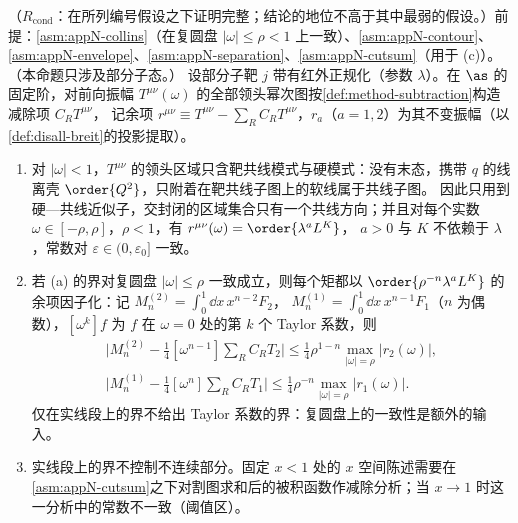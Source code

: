 \begin{proposition}\label{prop:disall-two-routes}
（$R_{\mathrm{cond}}$：在所列编号假设之下证明完整；结论的地位不高于其中最弱的假设。）前提：\cref{asm:appN-collins}（在复圆盘 $|\omega|\le\rho<1$ 上一致）、\cref{asm:appN-contour}、\cref{asm:appN-envelope}、\cref{asm:appN-separation}、\cref{asm:appN-cutsum}（用于 (c)）。（本命题只涉及部分子态。）
设部分子靶 $j$ 带有红外正规化（参数 $\lambda$）。在 $\as$ 的固定阶，对前向振幅 $T^{\mu\nu}(\omega)$ 的全部领头幂次图按\cref{def:method-subtraction}构造减除项 $C_RT^{\mu\nu}$，
记余项 $r^{\mu\nu}\equiv T^{\mu\nu}-\sum_RC_RT^{\mu\nu}$，$r_a$（$a=1,2$）为其不变振幅（以\cref{def:disall-breit}的投影提取）。
\begin{enumerate}[label=(\alph*),leftmargin=2em,itemsep=1pt,topsep=2pt]
\item 对 $|\omega|<1$，$T^{\mu\nu}$ 的领头区域只含靶共线模式与硬模式：没有末态，携带 $q$ 的线离壳 $\order{Q^2}$，只附着在靶共线子图上的软线属于共线子图。
因此只用到硬—共线近似子，交封闭的区域集合只有一个共线方向；并且对每个实数 $\omega\in[-\rho,\rho]$，$\rho<1$，有 $r^{\mu\nu}(\omega)=\order{\lambda^aL^K}$，
$a>0$ 与 $K$ 不依赖于 $\lambda$，常数对 $\varepsilon\in(0,\varepsilon_0]$ 一致。
\item 若 (a) 的界对复圆盘 $|\omega|\le\rho$ 一致成立，则每个矩都以 $\order{\rho^{-n}\lambda^aL^K}$ 的余项因子化：记 $M^{(2)}_n=\int_0^1\dd x\,x^{n-2}F_2$，
$M^{(1)}_n=\int_0^1\dd x\,x^{n-1}F_1$（$n$ 为偶数），$[\omega^k]f$ 为 $f$ 在 $\omega=0$ 处的第 $k$ 个 Taylor 系数，则
\begin{equation}\label{eq:disall-cauchy}
\begin{gathered}
\Big|M^{(2)}_n-\tfrac14[\omega^{n-1}]\textstyle\sum_RC_RT_2\Big|\le\tfrac14\rho^{1-n}\max_{|\omega|=\rho}|r_2(\omega)|,\\
\Big|M^{(1)}_n-\tfrac14[\omega^{n}]\textstyle\sum_RC_RT_1\Big|\le\tfrac14\rho^{-n}\max_{|\omega|=\rho}|r_1(\omega)|.
\end{gathered}
\end{equation}
仅在实线段上的界不给出 Taylor 系数的界：复圆盘上的一致性是额外的输入。
\item 实线段上的界不控制不连续部分。固定 $x<1$ 处的 $x$ 空间陈述需要在\cref{asm:appN-cutsum}之下对割图求和后的被积函数作减除分析；当 $x\to1$ 时这一分析中的常数不一致（阈值区）。
\end{enumerate}
\end{proposition}

